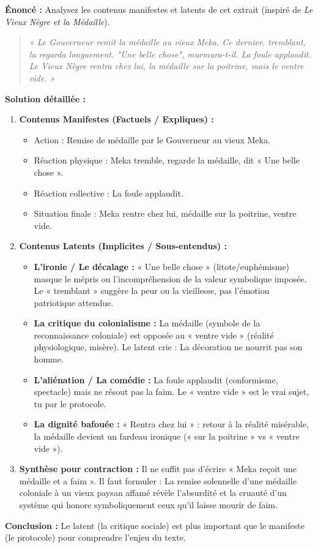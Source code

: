 \documentclass[11pt]{article}
\newcommand{\cle}[1]{{\popxbold\color{popdark}#1}}
\begin{document}
\begin{exoresolu}
    \textbf{Énoncé :} Analysez les contenus manifestes et latents de cet extrait (inspiré de \emph{Le Vieux Nègre et la Médaille}).
    \begin{quote}
        \textit{« Le Gouverneur remit la médaille au vieux Meka. Ce dernier, tremblant, la regarda longuement. "Une belle chose", murmura-t-il. La foule applaudit. Le Vieux Nègre rentra chez lui, la médaille sur la poitrine, mais le ventre vide. »}
    \end{quote}
    \tcblower
    \textbf{Solution détaillée :}
    \begin{enumerate}
        \item \textbf{Contenus Manifestes (Factuels / Expliques) :}
            \begin{itemize}
                \item Action : Remise de médaille par le Gouverneur au vieux Meka.
                \item Réaction physique : Meka tremble, regarde la médaille, dit « Une belle chose ».
                \item Réaction collective : La foule applaudit.
                \item Situation finale : Meka rentre chez lui, médaille sur la poitrine, ventre vide.
            \end{itemize}
        \item \textbf{Contenus Latents (Implicites / Sous-entendus) :}
            \begin{itemize}
                \item \textbf{L'ironie / Le décalage :} « Une belle chose » (litote/euphémisme) masque le mépris ou l'incompréhension de la valeur symbolique imposée. Le « tremblant » suggère la peur ou la vieillesse, pas l'émotion patriotique attendue.
                \item \textbf{La critique du colonialisme :} La médaille (symbole de la reconnaissance coloniale) est opposée au « ventre vide » (réalité physiologique, misère). Le latent crie : \cle{La décoration ne nourrit pas son homme}.
                \item \textbf{L'aliénation / La comédie :} La foule applaudit (conformisme, spectacle) mais ne résout pas la faim. Le « ventre vide » est le vrai sujet, tu par le protocole.
                \item \textbf{La dignité bafouée :} « Rentra chez lui » : retour à la réalité misérable, la médaille devient un fardeau ironique (« sur la poitrine » vs « ventre vide »).
            \end{itemize}
        \item \textbf{Synthèse pour contraction :} Il ne suffit pas d'écrire « Meka reçoit une médaille et a faim ». Il faut formuler : \cle{La remise solennelle d'une médaille coloniale à un vieux paysan affamé révèle l'absurdité et la cruauté d'un système qui honore symboliquement ceux qu'il laisse mourir de faim.}
    \end{enumerate}
    \textbf{Conclusion :} Le latent (la critique sociale) est plus important que le manifeste (le protocole) pour comprendre l'enjeu du texte.
\end{exoresolu}
\end{document}
